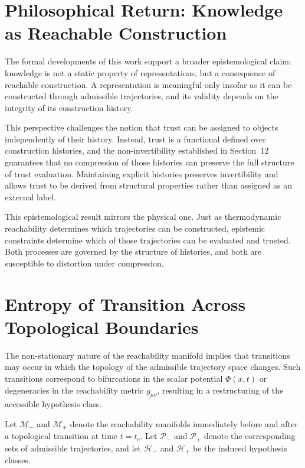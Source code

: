 \documentclass[12pt]{article}
\theoremstyle{plain}
\theoremstyle{definition}
\theoremstyle{remark}
\begin{document}
\section{Philosophical Return: Knowledge as Reachable Construction}

The formal developments of this work support a broader epistemological claim: knowledge is not a static property of representations, but a consequence of reachable construction. A representation is meaningful only insofar as it can be constructed through admissible trajectories, and its validity depends on the integrity of its construction history.

This perspective challenges the notion that trust can be assigned to objects independently of their history. Instead, trust is a functional defined over construction histories, and the non-invertibility established in Section~12 guarantees that no compression of those histories can preserve the full structure of trust evaluation. Maintaining explicit histories preserves invertibility and allows trust to be derived from structural properties rather than assigned as an external label.

This epistemological result mirrors the physical one. Just as thermodynamic reachability determines which trajectories can be constructed, epistemic constraints determine which of those trajectories can be evaluated and trusted. Both processes are governed by the structure of histories, and both are susceptible to distortion under compression.

\section{Entropy of Transition Across Topological Boundaries}

The non-stationary nature of the reachability manifold implies that transitions may occur in which the topology of the admissible trajectory space changes. Such transitions correspond to bifurcations in the scalar potential $\Phi(x,t)$ or degeneracies in the reachability metric $g_{\mu\nu}$, resulting in a restructuring of the accessible hypothesis class.

Let $\mathcal{M}_-$ and $\mathcal{M}_+$ denote the reachability manifolds immediately before and after a topological transition at time $t = t_c$. Let $\mathcal{P}_-$ and $\mathcal{P}_+$ denote the corresponding sets of admissible trajectories, and let $\mathcal{H}_-$ and $\mathcal{H}_+$ be the induced hypothesis classes.
\end{document}
